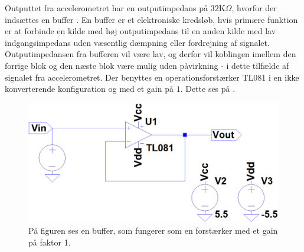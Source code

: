 \noindent Outputtet fra accelerometret har en outputimpedans på $32$K$\Omega$, hvorfor der indsættes en buffer \cite{Devices2009}. En buffer er et elektroniske kredsløb, hvis primære funktion er at forbinde en kilde med høj outputimpedans til en anden kilde med lav indgangsimpedans uden væsentlig dæmpning eller fordrejning af signalet. Outputimpedansen fra bufferen vil være lav, og derfor vil koblingen imellem den forrige blok og den næste blok være mulig uden påvirkning - i dette tilfælde af signalet fra accelerometret. Der benyttes en operationsforstærker TL081 i en ikke konverterende konfiguration og med et gain på $1$.\cite{Schaumann2014} Dette ses på .
\begin{figure}[H]
	\centering
	\includegraphics[scale=0.4]{figures/cProblemloesning/Buffer_LT.png}
	\caption{På figuren ses en buffer, som fungerer som en forstærker med et gain på faktor 1.}
	\label{fig:Buffer}
\end{figure}

